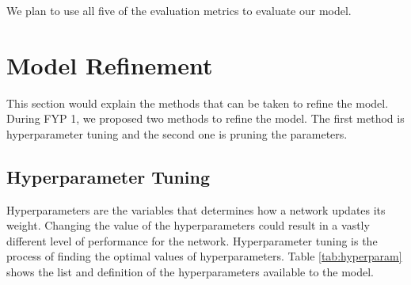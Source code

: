  We plan to use all five of the evaluation metrics to evaluate our model.

\section{Model Refinement}

This section would explain the methods that can be taken to refine the model. During FYP 1, we proposed two methods to refine the model. The first method is hyperparameter tuning and the second one is pruning the parameters. 
\subsection{Hyperparameter Tuning}

Hyperparameters are the variables that determines how a network updates its weight. Changing the value of the hyperparameters could result in a vastly different level of performance for the network. Hyperparameter tuning is the process of finding the optimal values of hyperparameters. Table \ref{tab:hyperparam} shows the list and definition of the hyperparameters available to the model.
